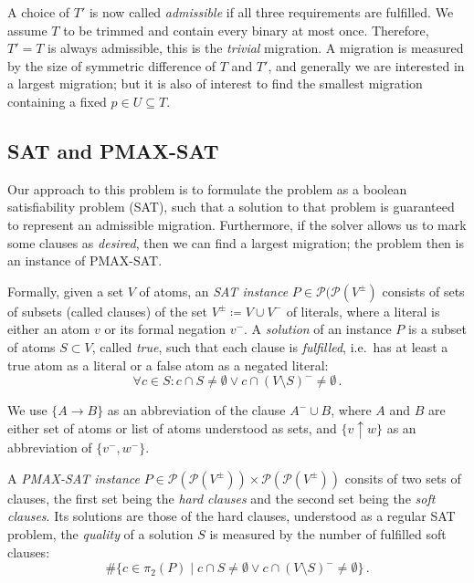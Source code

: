 \documentclass[halfparskip,11pt]{scrartcl}
\begin{document}

A choice of $T'$ is now called \emph{admissible} if all three requirements are fulfilled. We assume $T$ to be trimmed and contain every binary at most once. Therefore, $T'=T$ is always admissible, this is the \emph{trivial} migration. A migration is measured by the size of symmetric difference of $T$ and $T'$, and generally we are interested in a largest migration; but it is also of interest to find the smallest migration containing a fixed $p\in U\subseteq T$.

\subsection{SAT and PMAX-SAT}
\label{sec:sat}

Our approach to this problem is to formulate the problem as a boolean satisfiability problem (SAT), such that a solution to that problem is guaranteed to represent an admissible migration. Furthermore, if the solver allows us to mark some clauses as \emph{desired}, then we can find a largest migration; the problem then is an instance of PMAX-SAT.

Formally, given a set $V$ of atoms, an \emph{SAT instance} $P\in \mathcal P(\mathcal P(V^\pm)$ consists of sets of subsets (called clauses) of the set $V^\pm \coloneqq V \cup V^-$ of literals, where a literal is either an atom $v$ or its formal negation $v^-$. A \emph{solution} of an instance $P$ is a subset of atoms $S\subset V$, called \emph{true}, such that each clause is \emph{fulfilled}, i.e.\ has at least a true atom as a literal or a false atom as a negated literal:
\[
\forall c\in S\colon c\cap S \ne \emptyset \vee c \cap (V\setminus S)^- \ne \emptyset\,.
\]

We use $\{A \to B\}$ as an abbreviation of the clause $A^- \cup B$, where $A$ and $B$ are either set of atoms or list of atoms understood as sets, and $\{v\uparrow w\}$ as an abbreviation of $\{v^-,w^-\}$.

A \emph{PMAX-SAT instance} $P\in \mathcal P(\mathcal P(V^\pm))\times \mathcal P(\mathcal P(V^\pm))$ consits of two sets of clauses, the first set being the \emph{hard clauses} and the second set being the \emph{soft clauses}. Its solutions are those of the hard clauses, understood as a regular SAT problem, the \emph{quality} of a solution $S$ is measured by the number of fulfilled soft clauses:
\[
\#\{c\in \pi_2(P) \mid c\cap S \ne \emptyset \vee c \cap (V\setminus S)^- \ne \emptyset\}\,.
\]
\end{document}
